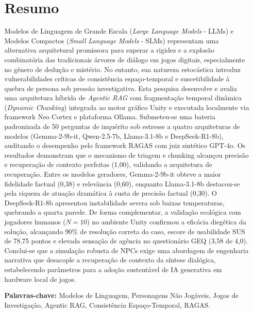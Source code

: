 \documentclass[12pt,a4paper,oneside]{report}
\begin{document}
\chapter*{Resumo}
\noindent Modelos de Linguagem de Grande Escala (\textit{Large Language Models} - LLMs) e Modelos Compactos (\textit{Small Language Models} - SLMs) representam uma alternativa arquitetural promissora para superar a rigidez e a explosão combinatória das tradicionais árvores de diálogo em jogos digitais, especialmente no gênero de dedução e mistério. No entanto, sua natureza estocástica introduz vulnerabilidades críticas de consistência espaço-temporal e suscetibilidade à quebra de persona sob pressão investigativa. Esta pesquisa desenvolve e avalia uma arquitetura híbrida de \textit{Agentic RAG} com fragmentação temporal dinâmica (\textit{Dynamic Chunking}) integrada ao motor gráfico Unity e executada localmente via framework Neo Cortex e plataforma Ollama. Submeteu-se uma bateria padronizada de 50 perguntas de inquérito sob estresse a quatro arquiteturas de modelos (Gemma-2-9b-it, Qwen-2.5-7b, Llama-3.1-8b e DeepSeek-R1-8b), auditando o desempenho pelo framework RAGAS com juiz sintético GPT-4o. Os resultados demonstram que o mecanismo de triagem e chunking alcançou precisão e recuperação de contexto perfeitas (1,00), validando a arquitetura de recuperação. Entre os modelos geradores, Gemma-2-9b-it obteve a maior fidelidade factual (0,38) e relevância (0,60), enquanto Llama-3.1-8b destacou-se pela riqueza de atuação dramática à custa de precisão factual (0,30). O DeepSeek-R1-8b apresentou instabilidade severa sob baixas temperaturas, quebrando a quarta parede. De forma complementar, a validação ecológica com jogadores humanos ($N = 10$) no ambiente Unity confirmou a eficácia diegética da solução, alcançando 90\% de resolução correta do caso, escore de usabilidade SUS de 78,75 pontos e elevada sensação de agência no questionário GEQ (3,58 de 4,0). Conclui-se que a simulação robusta de NPCs exige uma abordagem de engenharia narrativa que desacople a recuperação de contexto da síntese dialógica, estabelecendo parâmetros para a adoção sustentável de IA generativa em hardware local de jogos.

\vspace{0.6cm}
\noindent \textbf{Palavras-chave:} Modelos de Linguagem, Personagens Não Jogáveis, Jogos de Investigação, Agentic RAG, Consistência Espaço-Temporal, RAGAS.

\newpage
\end{document}
